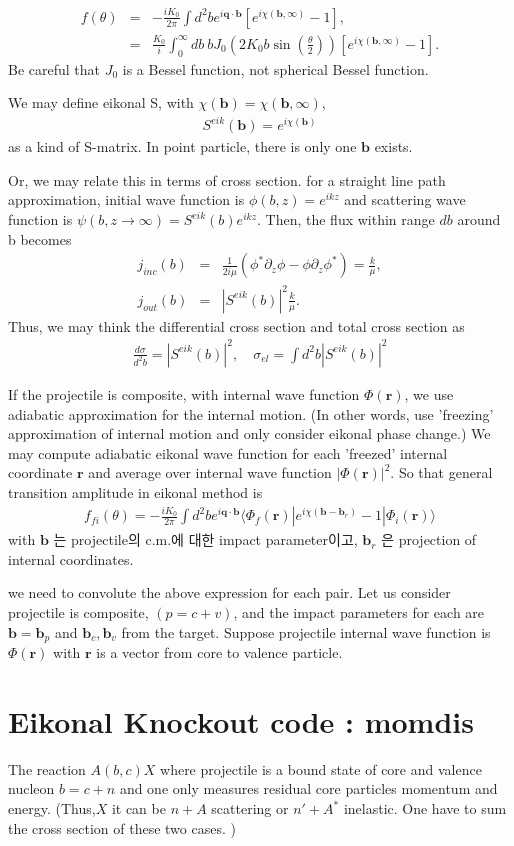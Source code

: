 \documentclass[11pt]{book}
\def\bm{\boldsymbol}
\def\vq{{\bm q}}
\def\vr{{\bm r}}
\def\la{\langle}
\def\ra{\rangle}
\newcommand{\bea}{\begin{eqnarray}}
\newcommand{\eea}{\end{eqnarray}}
\newcommand{\no}{\nonumber \\}
\newcommand{\del}{\partial}
\begin{document}
\bea 
f(\theta)&=& -\frac{i K_0}{2\pi}\int d^2 b e^{i\vq\cdot{\bm b}}
  [e^{i\chi({\bm b},\infty)}-1], \no 
  &=&\frac{K_0}{i}\int_0^\infty db\ b J_0(2K_0 b\sin(\frac{\theta}{2}))
     [e^{i\chi({\bm b},\infty)}-1]. 
\eea 
Be careful that $J_0$ is a Bessel function, not spherical Bessel function.

We may define eikonal S, with $\chi({\bm b})=\chi({\bm b},\infty)$,
\bea 
S^{eik}({\bm b})=e^{i\chi({\bm b})}
\eea 
as a kind of S-matrix. In point particle, there is only one ${\bm b}$ exists.

Or, we may relate this in terms of cross section. 
for a straight line path approximation, initial wave function is 
$\phi(b,z)=e^{ikz}$ and scattering wave function is 
$\psi(b,z\to \infty)=S^{eik}(b)e^{ikz}$. Then, the flux within
range $db$ around b becomes 
\bea 
j_{inc}(b)  &=&\frac{1}{2 i \mu}(\phi^*\del_z \phi-\phi\del_z \phi^*)=\frac{k}{\mu},\no 
j_{out}(b)&=& |S^{eik}(b)|^2\frac{k}{\mu}.
\eea 
Thus, we may think the differential cross section and total cross section as
\bea 
\frac{d\sigma}{d^2 b}=|S^{eik}(b)|^2,\quad  \sigma_{el}=\int d^2b |S^{eik}(b)|^2
\eea 


If the projectile is composite, with internal wave function $\Phi(\vr)$,
we use adiabatic approximation for the internal motion. 
(In other words, use 'freezing' approximation of internal motion
and only consider eikonal phase change.) 
We may compute adiabatic eikonal wave function for each
'freezed' internal coordinate $\vr$ and average over internal wave function 
$|\Phi(\vr)|^2$. 
So that general transition amplitude in eikonal method is
\bea 
f_{fi}(\theta)=-\frac{i K_0}{2\pi}\int d^2 b  e^{i\vq\cdot{\bm b}}
         \la \Phi_f(\vr)|e^{i\chi({\bm b}-{\bm b}_r)}-1|\Phi_i(\vr)\ra 
\eea 
with ${\bm b}$ 는 projectile의 c.m.에 대한 impact parameter이고, 
${\bm b}_r$ 은 projection of internal coordinates.  


we need to 
convolute the above expression for each pair. Let us consider projectile is composite,
$(p=c+v)$, and the impact parameters for each are 
${\bm b}={\bm b}_p$ and ${\bm b}_c,{\bm b}_v$ from the target.  
Suppose projectile internal wave function is $\Phi(\vr)$ with 
$\vr$ is a vector from core to valence particle. 

\section{Eikonal Knockout code : momdis}

The reaction $A(b,c)X$ where projectile is a bound state of core and valence nucleon $b=c+n$
and one only measures residual core particles momentum and energy. 
(Thus,$X$ it can be $n+A$ scattering or $n'+A^*$ inelastic.
One have to sum the cross section of these two cases. 
) 
\end{document}
